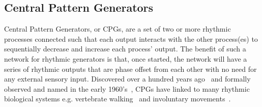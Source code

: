 \subsection{Central Pattern Generators}
\label{sec:CPG_overview}
Central Pattern Generators, or CPGs, are a set of two or more rhythmic processes connected such that each output interacts with the other process(es) to sequentially decrease and increase each process' output.
The benefit of such a network for rhythmic generators is that, once started, the network will have a series of rhythmic outputs that are phase offset from each other with no need for any external sensory input.
Discovered over a hundred years ago~\cite{brown1911intrinsic} and formally observed and named in the early 1960's~\cite{wilson1961central}, CPGs have linked to many rhythmic biological systems e.g. vertebrate walking~\cite{brown1911intrinsic,grillner2006biological} and involuntary movements~\cite{janczewski2006distinct,robertson1981oscillatory}.


